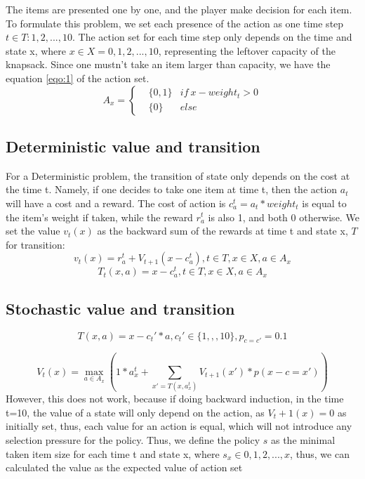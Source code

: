 The items are presented one by one, and the player make decision for each item. To formulate this problem, we set each presence of the action as one time step $t \in T:{1,2,...,10}$. The action set for each time step only depends on the time and state x, where $x \in X = {0, 1, 2, ...,10}$, representing the leftover capacity of the knapsack. Since one mustn't take an item larger than capacity, we have the equation \ref{eqo:1} of the action set. 
\begin{equation}
\label{eqo:1}
A_x = \left\{
\begin{aligned}
    &\{0, 1\} & if\ x - weight_t >0 \\
    &\{0\} & else
\end{aligned}
\right.
\end{equation}

\subsection{Deterministic value and transition}
For a Deterministic problem, the transition of state only depends on the cost at the time t. Namely, if one decides to take one item at time t, then the action $a_t$ will have a cost and a reward. The cost of action is $c^t_a = a_t * weight_t$ is equal to the item's weight if taken, while the reward $r^t_a$ is also 1, and both 0 otherwise. We set the value $v_t(x)$ as the backward sum of the rewards at time t and state x, $T$for transition:
\begin{equation}
    v_t(x) = r^t_a + V_{t+1}(x-c^t_a),t\in T, x \in X, a\in A_x
\end{equation}
\begin{equation}
    T_t(x,a) = x - c^t_a, t\in T, x \in X, a\in A_x
\end{equation}

\subsection{Stochastic value and transition}

\begin{equation}
    T(x,a) = x - c_t'*a, c_t'\in \{1,,,10\}, p_{c=c'} = 0.1
\end{equation}

\begin{equation}
    V_t(x) = \max_{a\in A_x}(1*a_x^t + \sum_{x' = T(x,a_x^t)} V_{t+1}(x')*p(x-c=x'))
\end{equation}
However, this does not work, because if doing backward induction, in the time t=10, the value of a state will only depend on the action, as $V_t+1(x)=0$ as initially set, thus, each value for an action is equal, which will not introduce any selection pressure for the policy.
Thus, we define the policy $s$ as the minimal taken item size for each time t and state x, where $s_x \in {0,1,2,...,x}$, thus, we can calculated the value as the expected value of action set 

